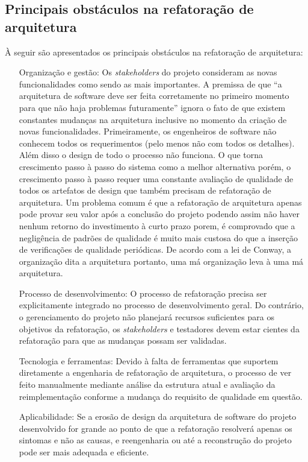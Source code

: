 \subsection{Principais obstáculos na refatoração de arquitetura}

À seguir são apresentados os principais obstáculos na refatoração de arquitetura:

\begin{itemize}

\item[Organização e gestão:] Os \textit{stakeholders} do projeto consideram as novas funcionalidades como sendo as mais importantes.
A premissa de que “a arquitetura de software deve ser feita corretamente no primeiro momento para que não haja problemas futuramente” ignora o fato de que existem constantes mudanças na arquitetura inclusive no momento da criação de novas funcionalidades.
Primeiramente, os engenheiros de software não conhecem todos os requerimentos (pelo menos não com todos os detalhes). 
Além disso o design de todo o processo não funciona. O que torna crescimento passo à passo do sistema como a melhor alternativa porém, o crescimento passo à passo requer uma constante avaliação de qualidade de todos os artefatos de design que também precisam de refatoração de arquitetura. Um problema comum é que a refatoração de arquitetura apenas pode provar seu valor após a conclusão do projeto podendo assim não haver nenhum retorno do investimento à curto prazo porem, é comprovado que a negligência de padrões de qualidade é muito mais custosa do que a inserção de verificações de qualidade periódicas. De acordo com a lei de Conway, a organização dita a arquitetura portanto, uma má organização leva à uma má arquitetura.

\item[Processo de desenvolvimento:] O processo de refatoração precisa ser explicitamente integrado no processo de desenvolvimento geral. Do contrário, o gerenciamento do projeto não planejará recursos suficientes para os objetivos da refatoração,
os \textit{stakeholders} e testadores devem estar cientes da refatoração para que as mudanças possam ser validadas.

\item[Tecnologia e ferramentas:] Devido à falta de ferramentas que suportem diretamente a engenharia de refatoração de arquitetura, o processo de ver feito manualmente mediante análise da estrutura atual e avaliação da reimplementação conforme a mudança do requisito de qualidade em questão.

\item[Aplicabilidade:] Se a erosão de design da arquitetura de software do projeto desenvolvido for grande ao ponto de que a refatoração resolverá apenas os sintomas e não as causas, e reengenharia ou até a reconstrução do projeto pode ser mais adequada e eficiente.


\end{itemize}


